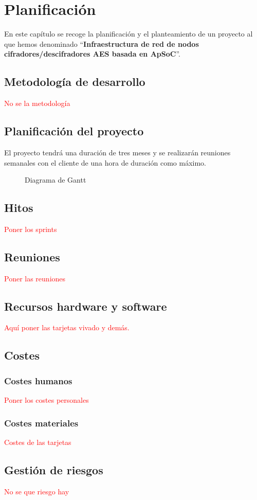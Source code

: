 \chapter{Planificación}
En este capítulo se recoge la planificación y el planteamiento de un proyecto al que hemos denominado ``\textbf{Infraestructura de red de nodos cifradores/descifradores AES basada en ApSoC}''.

\section{Metodología de desarrollo}
\textcolor{red}{No se la metodología}

\section{Planificación del proyecto}
El proyecto tendrá una duración de tres meses y se realizarán reuniones semanales con el cliente de una hora de duración como máximo.
\newpage
\begin{figure}[h]
	\centering
	\caption{Diagrama de Gantt}
	\label{Diagrama de Gantt}
\end{figure}

\section{Hitos} %
\textcolor{red}{Poner los sprints}


\section{Reuniones}
\textcolor{red}{Poner las reuniones}

\section{Recursos hardware y software}
\textcolor{red}{Aquí poner las tarjetas vivado y demás.}

\section{Costes}
\subsection{Costes humanos}
\textcolor{red}{Poner los costes personales}

\subsection{Costes materiales}
\textcolor{red}{Costes de las tarjetas}

\section{Gestión de riesgos}
\textcolor{red}{No se que riesgo hay}


